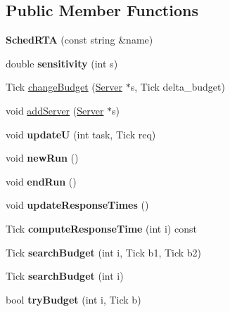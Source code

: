 \subsection*{Public Member Functions}
\begin{DoxyCompactItemize}
\item 
{\bfseries Sched\+R\+TA} (const string \&name)\hypertarget{classRTSim_1_1SchedRTA_a44caaeb1a79fd56912763e53b0f72b15}{}\label{classRTSim_1_1SchedRTA_a44caaeb1a79fd56912763e53b0f72b15}

\item 
double {\bfseries sensitivity} (int s)\hypertarget{classRTSim_1_1SchedRTA_a2e896e6405574fe020a7b95ddc45a471}{}\label{classRTSim_1_1SchedRTA_a2e896e6405574fe020a7b95ddc45a471}

\item 
Tick \hyperlink{classRTSim_1_1SchedRTA_aa237e2575aa3f94b792e2d1774666dec}{change\+Budget} (\hyperlink{classRTSim_1_1Server}{Server} $\ast$s, Tick delta\+\_\+budget)
\item 
void \hyperlink{classRTSim_1_1SchedRTA_a61b584ddef40f5f4e1a4737b285f9c4a}{add\+Server} (\hyperlink{classRTSim_1_1Server}{Server} $\ast$s)
\item 
void {\bfseries updateU} (int task, Tick req)\hypertarget{classRTSim_1_1SchedRTA_a4112d7feb6c803aeaf789be96cbaaffa}{}\label{classRTSim_1_1SchedRTA_a4112d7feb6c803aeaf789be96cbaaffa}

\item 
void {\bfseries new\+Run} ()\hypertarget{classRTSim_1_1SchedRTA_a69b7390ba95ab60b1518adf2ecac7840}{}\label{classRTSim_1_1SchedRTA_a69b7390ba95ab60b1518adf2ecac7840}

\item 
void {\bfseries end\+Run} ()\hypertarget{classRTSim_1_1SchedRTA_a418743533d903a008b3b263983c2f9d7}{}\label{classRTSim_1_1SchedRTA_a418743533d903a008b3b263983c2f9d7}

\item 
void {\bfseries update\+Response\+Times} ()\hypertarget{classRTSim_1_1SchedRTA_a1d043aca9398dc645357531ac5dc73c1}{}\label{classRTSim_1_1SchedRTA_a1d043aca9398dc645357531ac5dc73c1}

\item 
Tick {\bfseries compute\+Response\+Time} (int i) const \hypertarget{classRTSim_1_1SchedRTA_ac10205bd5b75f9f48611d5fac3f151d0}{}\label{classRTSim_1_1SchedRTA_ac10205bd5b75f9f48611d5fac3f151d0}

\item 
Tick {\bfseries search\+Budget} (int i, Tick b1, Tick b2)\hypertarget{classRTSim_1_1SchedRTA_ad8a4d8d0144ec2b4c79130151c493b30}{}\label{classRTSim_1_1SchedRTA_ad8a4d8d0144ec2b4c79130151c493b30}

\item 
Tick {\bfseries search\+Budget} (int i)\hypertarget{classRTSim_1_1SchedRTA_a0ae82523131d9e0f45eb276d1ed50895}{}\label{classRTSim_1_1SchedRTA_a0ae82523131d9e0f45eb276d1ed50895}

\item 
bool {\bfseries try\+Budget} (int i, Tick b)\hypertarget{classRTSim_1_1SchedRTA_a76dadf12cf5ccc7dffc023e5c5962b75}{}\label{classRTSim_1_1SchedRTA_a76dadf12cf5ccc7dffc023e5c5962b75}

\end{DoxyCompactItemize}

